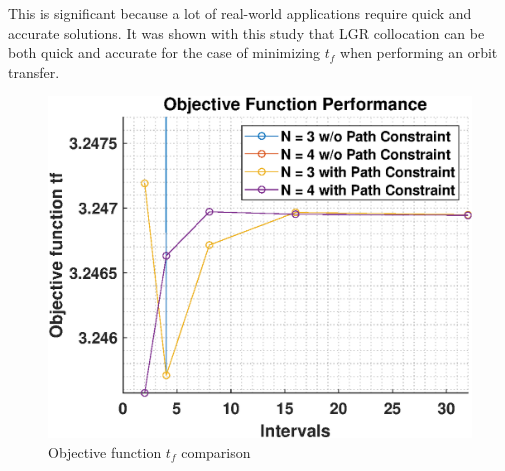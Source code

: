 \documentclass[]{article}
\begin{document}
This is significant because a lot of real-world applications require quick and accurate solutions. It was shown with this study that LGR collocation can be both quick and accurate for the case of minimizing \(t_f\) when performing an orbit transfer. 
	\begin{figure}
		\centering
		\includegraphics[scale=0.75]{minTfComparison.eps}
		\caption{Objective function \(t_f\) comparison}
		\label{fig:minTfComparison}
	\end{figure}
\end{document}
